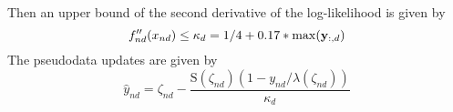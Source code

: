 \documentclass[10pt, a4paper,openany]{report}
\begin{document}
Then an upper bound of the second derivative of the log-likelihood is given by
\[
f''_{nd}(x_{nd}) \leq \kappa_d = 1/4 + 0.17*\max({\bf y}_{:,d})
\]
The pseudodata updates are given by
\[
\hat{y}_{nd} = \zeta_{nd} - \frac{\mathrm{S}(\zeta_{nd})(1-y_{nd}/\lambda(\zeta_{nd}))}{\kappa_d}
\]




\printbibliography
\end{document}
